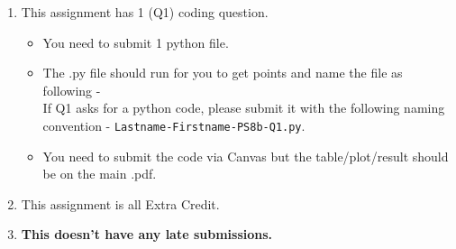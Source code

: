 \documentclass[12pt]{article}
\theoremstyle{remark}
\begin{document}
\begin{enumerate}
    \item This assignment has 1 (Q1) coding question. 
\begin{itemize}
    \item You need to submit 1 python file.
    \item The .py file should run for you to get points and name the file as following - \\
If Q1 asks for a python code, please submit it with the following naming convention - \texttt{Lastname-Firstname-PS8b-Q1.py}.
\item You need to submit the code via Canvas but the table/plot/result should be on the main .pdf.
\end{itemize}

\item This assignment is all Extra Credit.
\item \textbf{This doesn't have any late submissions.}
\end{enumerate}


\pagebreak
\end{document}
